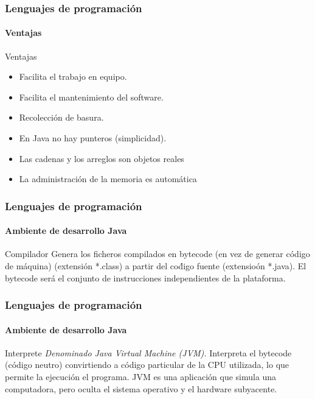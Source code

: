 \documentclass{beamer}
\begin{document}
		\begin{frame}
			\frametitle{Lenguajes de programaci\'on}
			\framesubtitle{Ventajas}

			\begin{exampleblock}{Ventajas}
				\begin{itemize}
					\item Facilita el trabajo en equipo.
					\item Facilita el mantenimiento del software.
					\item Recolecci\'on de basura.
					\item En Java no hay punteros (simplicidad).
					\item Las cadenas y los arreglos son objetos reales
					\item La administraci\'on de la memoria es autom\'atica
				\end{itemize}
			\end{exampleblock}
		\end{frame}

		\begin{frame}
			\frametitle{Lenguajes de programaci\'on}
			\framesubtitle{Ambiente de desarrollo Java}

			\begin{exampleblock}{Compilador}
				Genera los ficheros compilados en bytecode (en vez de generar c\'odigo de m\'aquina) (extensi\'on *.class) a partir del co\'digo fuente (extensio\'on *.java). El bytecode ser\'a el conjunto de instrucciones independientes de la plataforma.
			\end{exampleblock}
		\end{frame}
		
		\begin{frame}
			\frametitle{Lenguajes de programaci\'on}
			\framesubtitle{Ambiente de desarrollo Java}

			\begin{exampleblock}{Interprete}
				\emph{Denominado Java Virtual Machine (JVM).} Interpreta el bytecode (c\'odigo neutro) convirtiendo a c\'odigo particular de la CPU utilizada, lo que permite la ejecuci\'on el programa. JVM es una aplicaci\'on que simula una computadora, pero oculta el sistema operativo y el hardware subyacente.
			\end{exampleblock}
		\end{frame}
\end{document}

